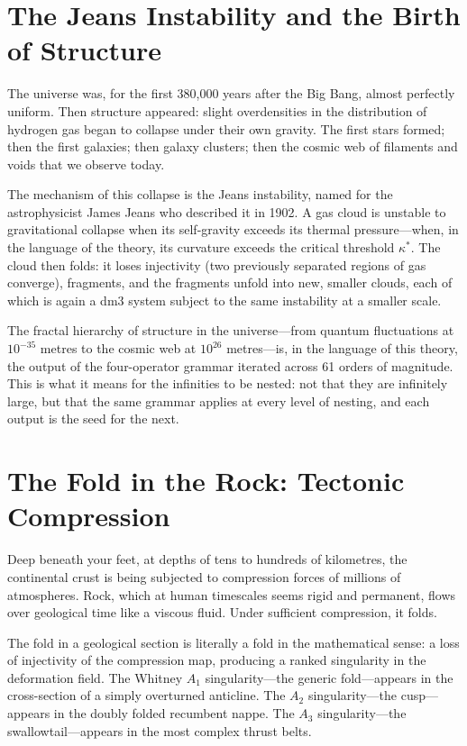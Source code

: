 \documentclass[12pt, oneside]{book}
\theoremstyle{plain}
\theoremstyle{definition}
\theoremstyle{remark}
\begin{document}
\section{The Jeans Instability and the Birth of Structure}

The universe was, for the first 380,000 years after the Big Bang,
almost perfectly uniform. Then structure appeared: slight
overdensities in the distribution of hydrogen gas began to
collapse under their own gravity. The first stars formed; then
the first galaxies; then galaxy clusters; then the cosmic web
of filaments and voids that we observe today.

The mechanism of this collapse is the Jeans instability, named
for the astrophysicist James Jeans who described it in 1902.
A gas cloud is unstable to gravitational collapse when its
self-gravity exceeds its thermal pressure---when, in the
language of the theory, its curvature exceeds the critical
threshold $\kappa^*$. The cloud then folds: it loses injectivity
(two previously separated regions of gas converge), fragments,
and the fragments unfold into new, smaller clouds, each of which
is again a dm3 system subject to the same instability at a
smaller scale.

The fractal hierarchy of structure in the universe---from
quantum fluctuations at $10^{-35}$ metres to the cosmic web
at $10^{26}$ metres---is, in the language of this theory, the
output of the four-operator grammar iterated across 61 orders
of magnitude. This is what it means for the infinities to be
nested: not that they are infinitely large, but that the same
grammar applies at every level of nesting, and each output
is the seed for the next.

\section{The Fold in the Rock: Tectonic Compression}

Deep beneath your feet, at depths of tens to hundreds of
kilometres, the continental crust is being subjected to
compression forces of millions of atmospheres. Rock, which
at human timescales seems rigid and permanent, flows over
geological time like a viscous fluid. Under sufficient
compression, it folds.

The fold in a geological section is literally a fold in the
mathematical sense: a loss of injectivity of the compression
map, producing a ranked singularity in the deformation field.
The Whitney $A_1$ singularity---the generic fold---appears in
the cross-section of a simply overturned anticline. The $A_2$
singularity---the cusp---appears in the doubly folded recumbent
nappe. The $A_3$ singularity---the swallowtail---appears in
the most complex thrust belts.
\end{document}
